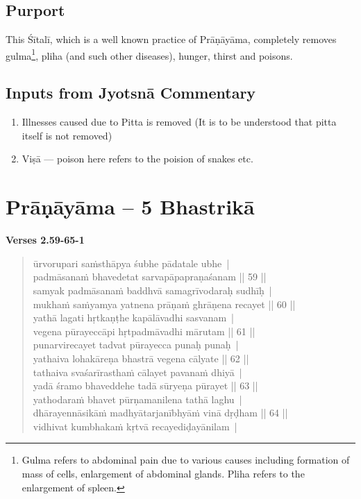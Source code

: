 \subsection*{Purport}


This Śītalī, which is a well known practice of Prāṇāyāma, completely removes gulma\footnote{Gulma refers to abdominal pain due to various causes including formation of mass of cells, enlargement of abdominal glands. Pliha refers to the enlargement of spleen.}, pliha (and such other diseases), hunger, thirst and poisons.

\subsection*{Inputs from Jyotsnā Commentary}


\begin{enumerate}
\item Illnesses caused due to Pitta is removed (It is to be understood that pitta itself is not removed)
\item Viṣā --- poison here refers to the poision of snakes etc.
\end{enumerate}

\section*{Prāṇāyāma – 5 Bhastrikā}

\noindent \textbf{Verses 2.59-65-1}

\begin{verse}
ūrvorupari saṁsthāpya śubhe pādatale ubhe |\\
padmāsanaṁ bhavedetat sarvapāpapraṇaśanam || 59 ||\\
samyak padmāsanaṁ baddhvā samagrīvodaraḥ sudhīḥ |\\ 
mukhaṁ saṁyamya yatnena prāṇaṁ ghrāṇena recayet || 60 ||\\
yathā lagati hṛtkaṇṭhe kapālāvadhi sasvanam |\\
vegena pūrayeccāpi hṛtpadmāvadhi mārutam || 61 ||\\
punarvirecayet tadvat pūrayecca punaḥ punaḥ |\\
yathaiva lohakāreṇa bhastrā vegena cālyate || 62 ||\\
tathaiva svaśarīrasthaṁ cālayet pavanaṁ dhiyā |\\
yadā śramo bhaveddehe tadā sūryeṇa pūrayet || 63 ||\\
yathodaraṁ bhavet pūrṇamanilena tathā laghu |\\
dhārayennāsikāṁ madhyātarjanībhyāṁ vinā dṛḍham || 64 ||\\
vidhivat kumbhakaṁ kṛtvā recayediḍayānilam |
\end{verse}

